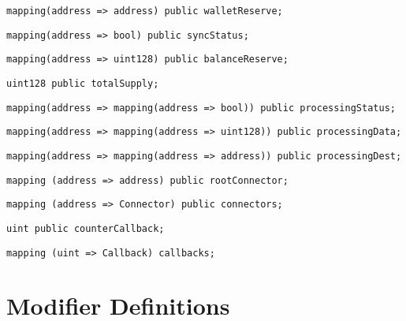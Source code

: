 \begin{lstlisting}[firstnumber=27]
  mapping(address => address) public walletReserve;
\end{lstlisting}

\begin{lstlisting}[firstnumber=28]
  mapping(address => bool) public syncStatus;
\end{lstlisting}

\begin{lstlisting}[firstnumber=29]
  mapping(address => uint128) public balanceReserve;
\end{lstlisting}

\begin{lstlisting}[firstnumber=31]
  uint128 public totalSupply;
\end{lstlisting}

\begin{lstlisting}[firstnumber=33]
  mapping(address => mapping(address => bool)) public processingStatus;
\end{lstlisting}

\begin{lstlisting}[firstnumber=34]
  mapping(address => mapping(address => uint128)) public processingData;
\end{lstlisting}

\begin{lstlisting}[firstnumber=35]
  mapping(address => mapping(address => address)) public processingDest;
\end{lstlisting}

\begin{lstlisting}[firstnumber=43]
  mapping (address => address) public rootConnector;
\end{lstlisting}

\begin{lstlisting}[firstnumber=44]
  mapping (address => Connector) public connectors;
\end{lstlisting}

\begin{lstlisting}[firstnumber=46]
  uint public counterCallback;
\end{lstlisting}

\begin{lstlisting}[firstnumber=62]
  mapping (uint => Callback) callbacks;
\end{lstlisting}

\section{Modifier Definitions}

